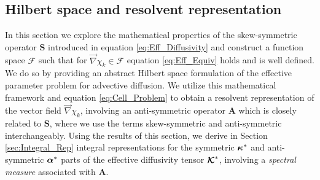\documentclass[11pt]{amsart}
\newcommand{\Sb}{\mathbf{S}}
\newcommand{\Ab}{\mathbf{A}}
\newcommand\Kbc{\mbox{\boldmath${\mathcal{K}}$}}
\newcommand{\Fs}{\mathscr{F}}
\newcommand\balpha{\mbox{\boldmath${\alpha}$}}
\newcommand\bkappa{\mbox{\boldmath${\kappa}$}}
\begin{document}
\subsection{Hilbert space and resolvent
  representation} \label{sec:Hilbert_Space}   
%
In this section we explore the mathematical properties of the
skew-symmetric operator $\Sb$ introduced in equation
\eqref{eq:Eff_Diffusivity} and construct a function space $\Fs$ such
that for $\vec{\nabla}\chi_k\in\Fs$ equation \eqref{eq:Eff_Equiv} holds and is
well defined. We do so by providing an abstract Hilbert space
formulation of the effective parameter problem for advective
diffusion. We utilize this mathematical framework and equation
\eqref{eq:Cell_Problem}  to obtain a resolvent representation of the
vector field $\vec{\nabla}\chi_k$, involving an anti-symmetric operator $\Ab$
which is closely related to $\Sb$, where we use the terms
skew-symmetric and anti-symmetric interchangeably. Using the results
of this section, we derive in Section \ref{sec:Integral_Rep} integral
representations for the symmetric $\bkappa^*$ and anti-symmetric
$\balpha^*$ parts of the effective diffusivity tensor $\Kbc^*$,
involving a \emph{spectral measure} associated with $\Ab$.       
\end{document}

